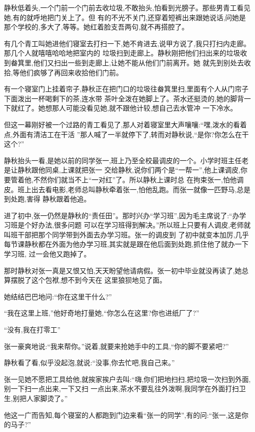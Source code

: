 ﻿\documentclass[12pt]{article}
\begin{document}
静秋低着头,一个门前一个门前去收垃圾,不敢抬头,怕看到光膀子。那些男青工看见她,有的就呼地把门关上了。但
有的不光不关门,还穿着短裤出来跟她说话,问她是那个学校的,多大了,等等。她红着脸支吾两句,就不再搭腔了。

有几个青工叫她进他们寝室去打扫一下,她不肯进去,说甲方说了,我只打扫内走廊。那几个人就嘻嘻哈哈地把室内的
垃圾扫到走廊上。静秋刚把他们扫出来的垃圾收到畚箕里,他们又扫出一些到走廊上,让她不能从他们门前离开。她
就先到别处去收拾,等他们疯够了再回来收拾他们门前。

有一个寝室门上挂着帘子,静秋正在把门口的垃圾往畚箕里扫,里面有个人从门帘子下面泼出一杯喝剩下的茶,连水带
茶叶全泼在她脚上了。茶水还挺烫的,她的脚背一下就红了。她想那人可能没看见她,就不跟他计较,想自己去水管冲
一下冷水。

但这一幕刚好被一个过路的青工看见了,那人对着寝室里大声嚷嚷:``嘿,泼水的看着点,外面有清洁工在干活
\myrule ''那人喊了一半就停下了,转而对静秋说,``是你?你怎么在干\myrule 这个?''

静秋抬头一看,是她以前的同学张一,班上乃至全校最调皮的一个。小学时班主任老是让静秋跟他同桌,上课就把张一
交给静秋,说你们两个是``一帮一'',他上课调皮,你要管着他,不然你们就当不上``一对红''了。所以静秋上课时总
在拘束张一,怕他调皮。班上出去看电影,老师总叫静秋牵着张一,怕他乱跑。而张一就像一匹野马,总是到处跑,害得
静秋跟着他追。

进了初中,张一仍然是静秋的``责任田''。那时兴办``学习班'',因为毛主席说了:``办学习班是个好办法,很多问题
可以在学习班得到解决。''所以班上只要有人调皮,老师就叫班干部把那个同学带到外面去办学习班。张一的调皮到
了初中就变本加厉,几乎每节课静秋都在外面为他办学习班,其实就是跟在他后面到处跑,抓住他了就办一下学习班,
过一会他又跑掉了。

那时静秋对张一真是又恨又怕,天天盼望他请病假。张一初中毕业就没再读了,她总算摆脱了这个包袱,想不到今天在
这里狼狈地见了面。

她结结巴巴地问:``你在\myrule 这里干什么?''

``我在这里上班,''他好奇地打量她,``你怎么在\myrule 这里?你也进纸厂了?''

``没有,我在\myrule 打零工\myrule ''

张一豪爽地说:``我来帮你。''说着,就要来抢她手中的工具,``你的脚\myrule 不要紧吧?''

静秋看了看,似乎没起泡,就说:``没事,你去忙吧,我自己来。''

张一见她不愿把工具给他,就挨家挨户去叫:``嗨,你们把地扫扫,把垃圾一次扫到外面,别一下扫一点出来,一下又扫
一点出来,茶水不要乱往外泼啊,我同学在外面打扫卫生,别把人家脚烫了。''

他这一广而告知,每个寝室的人都跑到门边来看``张一的同学'',有的问:``张一,这是你的马子?''
\end{document}
